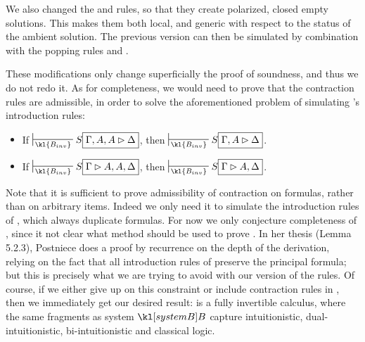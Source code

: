\begin{remark}
  We also changed the \rsf{\bot{-}} and \rsf{\top{+}} rules, so that they create
  polarized, closed empty solutions. This makes them both local, and generic
  with respect to the status of the ambient solution. The previous version can
  then be simulated by combination with the popping rules  and
  .
\end{remark}

These modifications only change superficially the proof of soundness, and thus
we do not redo it. As for completeness, we would need to prove that the
contraction rules are admissible, in order to solve the aforementioned problem
of simulating 's introduction rules:

\begin{lemma}
  \sbr
  \begin{itemize}
    \item If $\prov{\kl{B_{inv}}} S\select{\Gamma, A, A \J \Delta}$, then
          $\prov{\kl{B_{inv}}} S\select{\Gamma, A \J \Delta}$.
    \item If $\prov{\kl{B_{inv}}} S\select{\Gamma \J A, A, \Delta}$, then
          $\prov{\kl{B_{inv}}} S\select{\Gamma \J A, \Delta}$.
  \end{itemize}
\end{lemma}

Note that it is sufficient to prove admissibility of contraction on formulas,
rather than on arbitrary items. Indeed we only need it to simulate the
introduction rules of , which always duplicate formulas. For now we
only conjecture completeness of , since it not clear what method
should be used to prove . In her thesis
\cite{postniece_proof_2010} (Lemma 5.2.3), Postniece does a proof by recurrence
on the depth of the derivation, relying on the fact that all introduction rules
of  preserve the principal formula; but this is precisely what we
are trying to avoid with our version of the rules. Of course, if we either give
up on this constraint or include contraction rules in , then we
immediately get our desired result:  is a fully invertible
calculus, where the same fragments as system $\sysB$ capture intuitionistic,
dual-intuitionistic, bi-intuitionistic and classical logic.

